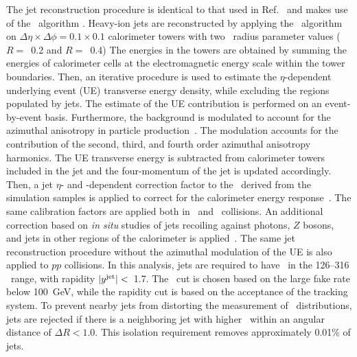 
The jet reconstruction procedure is identical to that used in Ref.~\cite{2019108} and makes use of the \antikt\ algorithm \cite{Cacciari:2008qp, Fastjet}. 
Heavy-ion jets are reconstructed by applying the \antikt\ algorithm on 
$\Delta \eta \times \Delta \phi = 0.1\times 0.1$  calorimeter towers with two \antikt\ radius parameter values ($R=$~0.2 and $R=$~0.4) The energies in the towers are obtained by summing the
	energies of calorimeter cells at the electromagnetic energy scale within the tower boundaries. Then,
	  an iterative procedure is used to estimate the $\eta$-dependent underlying event (UE)  transverse energy density, while excluding the regions populated by jets. The estimate of the UE contribution is performed on an event-by-event basis.
	Furthermore, the background is modulated to account for the azimuthal anisotropy in particle production~\cite{ATLAS:2012at}. The modulation accounts for the contribution of the second, third, and fourth order azimuthal anisotropy harmonics.
	The UE transverse energy is subtracted from calorimeter towers included in the jet and the four-momentum of the jet is updated accordingly.
	  Then, a jet $\eta$- and \pT-dependent  correction factor to the \ptjet\ 
	  derived from the simulation samples is applied to correct for the calorimeter energy
	  response~\cite{Aaboud:2017jcu}. The same calibration factors are applied both 
in \pp\ and \pbpb\ collisions.
An additional correction based on \textit{in situ} studies of jets recoiling against photons, $Z$ bosons, and jets in other regions of the calorimeter is
	  applied~\cite{ATL-PHYS-PUB-2015-036,2019167}. The same jet reconstruction procedure without the
	  azimuthal modulation of the UE is also applied to $pp$ collisions.
	  In this analysis, jets are required to have \ptjet\ in the 126--316 \GeV\ range, with rapidity  $|\mbox{$y^{\mathrm{jet}}$}|<$~1.7. The \ptjet\ cut is chosen based on the large fake rate below \mbox{100 GeV}, while the rapidity cut is based on the acceptance of the tracking system.
 To prevent nearby jets from distorting the measurement of \Dptr\ distributions, 
jets are rejected if there is a neighboring jet with higher \ptjet\ 
within an angular distance of $\Delta R < 1.0$. This isolation requirement removes approximately 0.01\% of jets.

